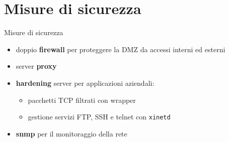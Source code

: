 \documentclass{beamer}
\begin{document}
  \section{Misure di sicurezza}
  	\begin{frame}{Misure di sicurezza}
  		\begin{itemize}
  			\item doppio \textbf{firewall} per proteggere la DMZ da accessi interni ed esterni
  			\item server \textbf{proxy}
  			\item \textbf{hardening} server per applicazioni aziendali:
  			\begin{itemize}
  				\item pacchetti TCP filtrati con wrapper
  				\item gestione servizi FTP, SSH e telnet con \texttt{xinetd}
  			\end{itemize}
  			\item \textbf{snmp} per il monitoraggio della rete
  		\end{itemize}
  	\end{frame}
\end{document}
